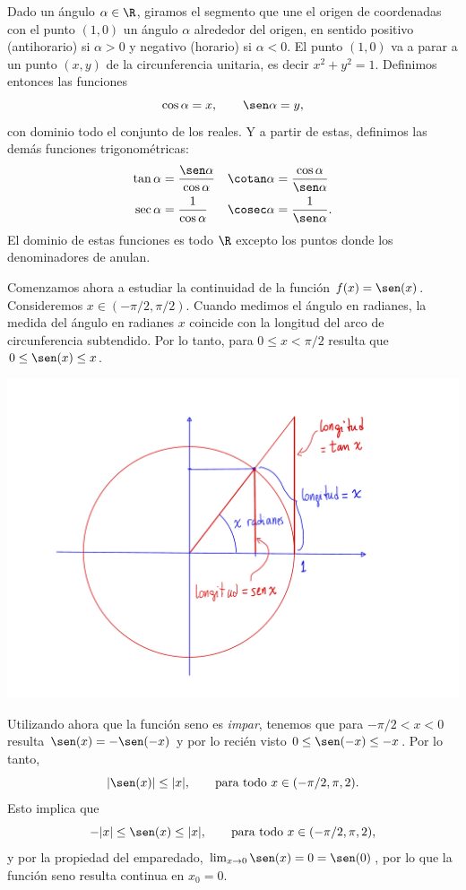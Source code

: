 Dado un ángulo $\alpha\in\R$, giramos el segmento que une el origen de coordenadas con el punto $(1,0)$ un ángulo $\alpha$ alrededor del origen, en sentido positivo (antihorario) si $\alpha>0$ y negativo (horario) si $\alpha<0$. El punto $(1,0)$ va a parar a un punto $(x,y)$ de la circunferencia unitaria, es decir $x^2+y^2=1$. Definimos entonces las funciones 
\[
\cos\alpha=x,\qquad \sen\alpha=y,
\]
con dominio todo el conjunto de los reales.
Y a partir de estas, definimos las demás funciones trigonométricas:
\begin{align*}
    \tan \alpha &= \frac{\sen\alpha}{\cos\alpha}
    & \cotan\alpha &= \frac{\cos\alpha}{\sen\alpha}
    \\
    \sec\alpha&= \frac{1}{\cos\alpha}
    & \cosec\alpha &= \frac{1}{\sen\alpha}.
\end{align*}
El dominio de estas funciones es todo $\R$ excepto los puntos donde los denominadores de anulan.

Comenzamos ahora a estudiar la continuidad de la función $f(x)=\sen(x)$. Consideremos $x\in(-\pi/2,\pi/2)$. 
Cuando medimos el ángulo en radianes, la medida del ángulo en radianes $x$ coincide con la longitud del arco de circunferencia subtendido. Por lo tanto, para $0\le x<\pi/2$ resulta que $0\le \sen(x)\le x$.

\centerline{\includegraphics[width=.8\textwidth]{pics/seno-continuo.pdf}}

Utilizando ahora que la función seno es \emph{impar}, tenemos que para $-\pi/2<x<0$ resulta $\sen(x)=-\sen(-x)$ y por lo recién visto $0\le \sen(-x)\le -x$.
Por lo tanto,
\[
|\sen(x)|\le |x|, \qquad\text{para todo $x\in(-\pi/2,\pi,2)$}. 
\]
Esto implica que 
\[
-|x|\le \sen(x) \le |x|, \qquad\text{para todo $x\in(-\pi/2,\pi,2)$},
\]
y por la propiedad del emparedado, $\lim_{x\to0}\sen(x)=0=\sen(0)$, por lo que la función seno resulta continua en $x_0=0$.

